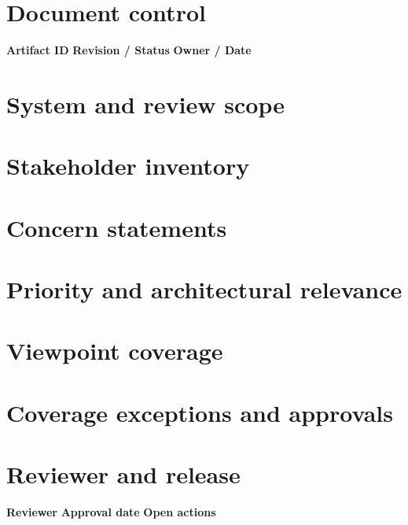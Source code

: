 \documentclass[10pt,letterpaper]{article}
\begin{document}
\DocProvenance
\section{Document control}
\textbf{Artifact ID}
\textbf{Revision / Status}
\textbf{Owner / Date}
\section{System and review scope}
\section{Stakeholder inventory}
\section{Concern statements}
\section{Priority and architectural relevance}
\section{Viewpoint coverage}
\section{Coverage exceptions and approvals}
\section{Reviewer and release}
\textbf{Reviewer}
\textbf{Approval date}
\textbf{Open actions}
\end{document}
